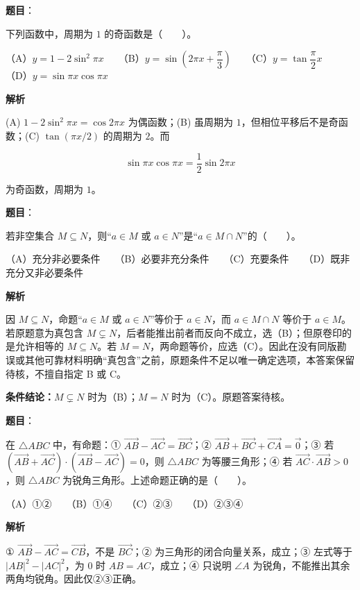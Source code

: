\begin{answer}

\textbf{题目}：

下列函数中，周期为 $1$ 的奇函数是\mbox{（　　）}。

（A）$y=1-2\sin^2\pi x$　　（B）$y=\sin\left(2\pi x+\dfrac{\pi}{3}\right)$　　（C）$y=\tan\dfrac{\pi}{2}x$　　（D）$y=\sin\pi x\cos\pi x$

\textbf{解析}

(A) $1-2\sin^2\pi x=\cos2\pi x$ 为偶函数；(B) 虽周期为 $1$，但相位平移后不是奇函数；(C) $\tan(\pi x/2)$ 的周期为 $2$。而

\nopagebreak[4]
\[\sin\pi x\cos\pi x=\frac12\sin2\pi x\]

为奇函数，周期为 $1$。


\end{answer}
\begin{answer}

\textbf{题目}：

若非空集合 $M\subseteq N$，则“$a\in M$ 或 $a\in N$”是“$a\in M\cap N$”的\mbox{（　　）}。

（A）充分非必要条件　　（B）必要非充分条件　　（C）充要条件　　（D）既非充分又非必要条件

\textbf{解析}

因 $M\subseteq N$，命题“$a\in M$ 或 $a\in N$”等价于 $a\in N$，而 $a\in M\cap N$ 等价于 $a\in M$。若原题意为真包含 $M\subsetneq N$，后者能推出前者而反向不成立，选（B）；但原卷印的是允许相等的 $M\subseteq N$。若 $M=N$，两命题等价，应选（C）。因此在没有同版勘误或其他可靠材料明确“真包含”之前，原题条件不足以唯一确定选项，本答案保留待核，不擅自指定 B 或 C。

\textbf{条件结论：}$M\subsetneq N$ 时为（B）；$M=N$ 时为（C）。原题答案待核。


\end{answer}
\begin{answer}

\textbf{题目}：

在 $\triangle ABC$ 中，有命题：① $\overrightarrow{AB}-\overrightarrow{AC}=\overrightarrow{BC}$；② $\overrightarrow{AB}+\overrightarrow{BC}+\overrightarrow{CA}=\vec{0}$；③ 若 $(\overrightarrow{AB}+\overrightarrow{AC})\cdot(\overrightarrow{AB}-\overrightarrow{AC})=0$，则 $\triangle ABC$ 为等腰三角形；④ 若 $\overrightarrow{AC}\cdot\overrightarrow{AB}>0$，则 $\triangle ABC$ 为锐角三角形。上述命题正确的是\mbox{（　　）}。

（A）①②　　（B）①④　　（C）②③　　（D）②③④

\textbf{解析}

① $\overrightarrow{AB}-\overrightarrow{AC}=\overrightarrow{CB}$，不是 $\overrightarrow{BC}$；② 为三角形的闭合向量关系，成立；③ 左式等于 $|AB|^2-|AC|^2$，为 $0$ 时 $AB=AC$，成立；④ 只说明 $\angle A$ 为锐角，不能推出其余两角均锐角。因此仅②③正确。


\end{answer}
